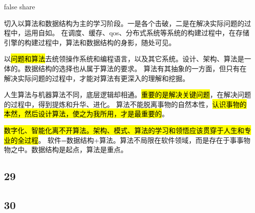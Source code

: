 false share

\hrulefill

切入以算法和数据结构为主的学习阶段。一是各个击破，二是在解决实际问题的过程中，运用自如。
在调度、缓存、qos、分布式系统等系统的构建过程中，在存储引擎的构建过程中，算法和数据结构的身影，随处可见。

以\hl{问题和算法}去统领操作系统和编程语言，以及其它系统。设计、架构、算法是一体的。数据结构的选择也从属于算法的要求。
算法有其抽象的一方面，但只有在解决实际问题的过程中，才能对算法有更深入的理解和挖掘。

人生算法与机器算法不同，底层逻辑却相通。\hl{重要的是解决关键问题}，在解决问题的过程中，得到提炼和升华、进化。
算法不能脱离事物的自然本性，\hl{认识事物的本然，然后设计算法，使之为我所用，才是最重要的}。

\hl{数字化、智能化离不开算法。架构、模式、算法的学习和领悟应该贯穿于人生和专业的全过程}。
软件=数据结构+算法。算法不局限在软件领域，而是存在于事事物物之中。数据结构是起点，算法是重点。

\subsection{29}

\subsection{30}
